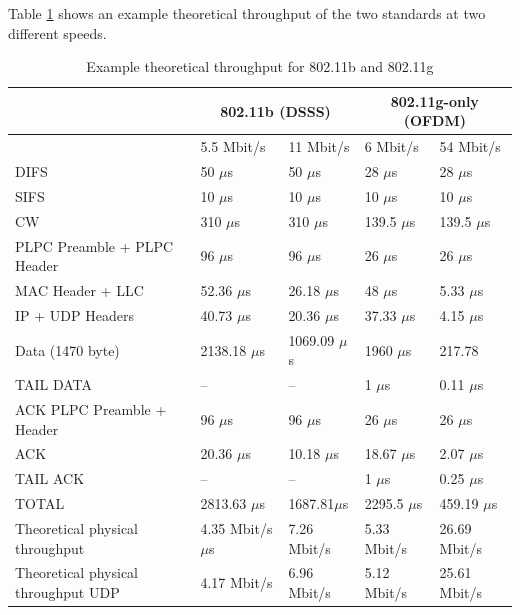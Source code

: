 	Table \ref{tbl:80211bgexample} shows an example theoretical throughput of the two standards at two different speeds.
	
	\begin{table}[h!]
		\begin{tabularx}{15cm}{ | X | X | X | X | X | }
			\hline
				 & \multicolumn{2}{|c|}{ 802.11b (DSSS)} & \multicolumn{2}{|c|}{ 802.11g-only (OFDM)} \\
				 \hline
				 & 5.5 Mbit/s & 11 Mbit/s & 6 Mbit/s & 54 Mbit/s \\
			\hline
				DIFS & 50 $\mu$s & 50 $\mu$s & 28 $\mu$s & 28 $\mu$s \\
			\hline
				SIFS & 10 $\mu$s & 10 $\mu$s & 10 $\mu$s & 10 $\mu$s \\
			\hline
				CW & 310 $\mu$s & 310 $\mu$s & 139.5 $\mu$s & 139.5 $\mu$s \\
			\hline
				PLPC Preamble + PLPC Header & 96 $\mu$s & 96 $\mu$s & 26 $\mu$s & 26 $\mu$s \\
			\hline
				MAC Header + LLC & 52.36 $\mu$s & 26.18 $\mu$s & 48 $\mu$s & 5.33 $\mu$s \\
			\hline
				IP + UDP Headers & 40.73 $\mu$s & 20.36 $\mu$s & 37.33 $\mu$s & 4.15 $\mu$s \\
			\hline
				Data (1470 byte)& 2138.18 $\mu$s & 1069.09 $\mu$s & 1960 $\mu$s & 217.78 \\
			\hline
				TAIL DATA & -- & -- & 1 $\mu$s & 0.11 $\mu$s \\
			\hline
				ACK PLPC Preamble + Header & 96 $\mu$s & 96 $\mu$s & 26 $\mu$s & 26 $\mu$s \\
			\hline
				ACK & 20.36 $\mu$s & 10.18 $\mu$s & 18.67 $\mu$s & 2.07 $\mu$s \\
			\hline
				TAIL ACK & -- & -- & 1 $\mu$s & 0.25 $\mu$s \\
			\hline
			\hline
				TOTAL & 2813.63 $\mu$s & 1687.81$\mu$s & 2295.5 $\mu$s & 459.19 $\mu$s \\
			\hline
			\hline
				Theoretical physical throughput & 4.35 Mbit/s $\mu$s & 7.26 Mbit/s & 5.33 Mbit/s & 26.69 Mbit/s \\
			\hline
			\hline
				Theoretical physical throughput UDP & 4.17 Mbit/s & 6.96 Mbit/s & 5.12 Mbit/s & 25.61 Mbit/s \\
			\hline
			
		\end{tabularx}
		\caption{Example theoretical throughput for 802.11b and 802.11g}
		\label{tbl:80211bgexample}
	\end{table}
	
